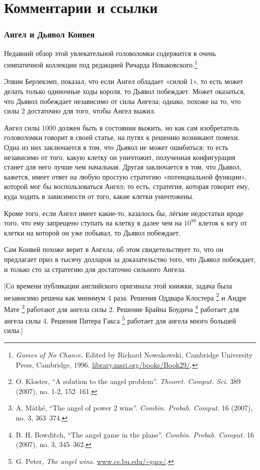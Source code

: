 \section*{Комментарии и ссылки}

\subsubsection*{Ангел и Дьявол Конвея}

Недавний обзор этой увлекательной головоломки содержится в очень симпатичной коллекции под редакцией Ричарда Новаковского.\footnote{\emph{Games of No Chance.} Edited by Richard Nowakowski, Cambridge University Press, Cambridge, 1996. \href{http://library.msri.org/books/Book29/}{\url{library.msri.org/books/Book29/}}.} 

Элвин Берлекэмп,  показал, что если Ангел обладает «силой 1», то есть может делать только одиночные ходы короля, то Дьявол побеждает.
Может оказаться, что Дьявол побеждает независимо от силы Ангела; 
однако, похоже на то, что силы 2 достаточно для того, чтобы Ангел выжил.

Ангел силы 1000 должен быть в состоянии выжить, но как сам изобретатель головоломки говорит в своей статье, на путях к решению возникают помехи.
Одна из них заключается в том, что Дьявол не может ошибиться;
то есть независимо от того, какую клетку он уничтожит, полученная конфигурация станет для него лучше чем начальная.
Другая заключается в том, что Дьявол, кажется, имеет ответ на любую простую стратегию «потенциальной функции», которой мог бы воспользоваться Ангел;
то есть, стратегия, которая говорит ему, куда ходить в зависимости от того, какие клетки уничтожены. 

Кроме того, если Ангел имеет какие-то, казалось бы, лёгкие недостатки вроде того, что ему запрещено ступать на клетку в далее чем на $10^{99}$ клеток к югу от клетки на которой он уже побывал, то Дьявол побеждает.

Сам Конвей похоже верит в Ангела, об этом свидетельствует то, что он предлагает приз в тысячу долларов за доказательство того, что Дьявол побеждает, и только сто за стратегию для достаточно сильного Ангела.

[Со времени публикации английского оригинала этой книжки, задача была независимо решена как минимум 4 раза.
Решения Оддвара Клостера%
\footnote{
O. Kloster, 
``A solution to the angel problem''.
\emph{Theoret. Comput. Sci.} 389 (2007), no. 1-2, 152--161.}
и Андре Мате%
\footnote{
A. Máthé, 
``The angel of power 2 wins''. 
\emph{Combin. Probab. Comput.} 16 (2007), no. 3, 363–374.}
работают для ангела силы 2.
Решение Брайна Боудича%
\footnote{B. H. Bowditch, ``The angel game in the plane''. \emph{Combin. Probab. Comput.} 16 (2007), no. 3, 345--362.}
работает для ангела силы 4.
Решения Питера Гакса%
\footnote{G. Peter, \emph{The angel wins.} \href{https://www.cs.bu.edu/~gacs/papers/angel.pdf}{\url{www.cs.bu.edu/~gacs/}}.}
работает для ангела много большей силы.]

